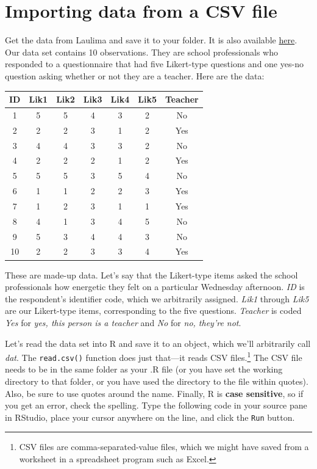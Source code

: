 \documentclass[
]{book}
\begin{document}
\hypertarget{importing}{%
\chapter{Importing data from a CSV file}\label{importing}}

Get the data from Laulima and save it to your folder. It is also available \href{http://www2.hawaii.edu/~georgeha/Handouts/SchoolSurvey.csv}{here}.
Our data set contains 10 observations. They are school professionals who responded to a questionnaire that had five Likert-type questions and one yes-no question asking whether or not they are a teacher.
Here are the data:

\begin{tabular}{c|c|c|c|c|c|c}
\hline
ID & Lik1 & Lik2 & Lik3 & Lik4 & Lik5 & Teacher\\
\hline
1 & 5 & 5 & 4 & 3 & 2 & No\\
\hline
2 & 2 & 2 & 3 & 1 & 2 & Yes\\
\hline
3 & 4 & 4 & 3 & 3 & 2 & No\\
\hline
4 & 2 & 2 & 2 & 1 & 2 & Yes\\
\hline
5 & 5 & 5 & 3 & 5 & 4 & No\\
\hline
6 & 1 & 1 & 2 & 2 & 3 & Yes\\
\hline
7 & 1 & 2 & 3 & 1 & 1 & Yes\\
\hline
8 & 4 & 1 & 3 & 4 & 5 & No\\
\hline
9 & 5 & 3 & 4 & 4 & 3 & No\\
\hline
10 & 2 & 2 & 3 & 3 & 4 & Yes\\
\hline
\end{tabular}

These are made-up data. Let's say that the Likert-type items asked the school professionals how energetic they felt on a particular Wednesday afternoon. \emph{ID} is the respondent's identifier code, which we arbitrarily assigned. \emph{Lik1} through \emph{Lik5} are our Likert-type items, corresponding to the five questions. \emph{Teacher} is coded \emph{Yes} for \emph{yes, this person is a teacher} and \emph{No} for \emph{no, they're not}.

Let's read the data set into R and save it to an object, which we'll arbitrarily call \emph{dat}. The \texttt{read.csv()} function does just that---it reads CSV files.\footnote{CSV files are comma-separated-value files, which we might have saved from a worksheet in a spreadsheet program such as Excel.} The CSV file needs to be in the same folder as your .R file (or you have set the working directory to that folder, or you have used the directory to the file within quotes). Also, be sure to use quotes around the name. Finally, R is \textbf{case sensitive}, so if you get an error, check the spelling. Type the following code in your source pane in RStudio, place your cursor anywhere on the line, and click the \texttt{Run} button.
\end{document}
